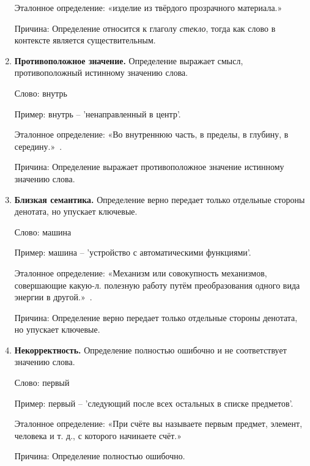 \documentclass[LI,VKR]{HSEUniversity}
\begin{document}
\begin{enumerate}
   Эталонное определение: «изделие из твёрдого прозрачного материала.»~\cite{TolkovyDmitriev}

   Причина: Определение относится к глаголу \textit{стекло}, тогда как слово в контексте является существительным.

\item \textbf{Противоположное значение.} Определение выражает смысл, противоположный истинному значению слова.

   Слово: внутрь

   Пример: внутрь – ’ненаправленный в центр’.

   Эталонное определение: «Во внутреннюю часть, в пределы, в глубину, в середину.»~\cite{TolkovyKuznetsov}.

   Причина: Определение выражает противоположное значение истинному значению слова.

\item \textbf{Близкая семантика.} Определение верно передает только отдельные стороны денотата, но упускает ключевые.

   Слово: машина

   Пример: машина – ’устройство с автоматическими функциями’.

   Эталонное определение: «Механизм или совокупность механизмов, совершающие какую-л. полезную работу путём преобразования одного вида энергии в другой.»~\cite{TolkovyKuznetsov}.

   Причина: Определение верно передает только отдельные стороны денотата, но упускает ключевые.

%
%
%

\item \textbf{Некорректность.} Определение полностью ошибочно и не соответствует значению слова.

   Слово: первый

   Пример: первый – ’следующий после всех остальных в списке предметов’.

   Эталонное определение: «При счёте вы называете первым предмет, элемент, человека и т. д., с которого начинаете счёт.»~\cite{TolkovyDmitriev}

   Причина: Определение полностью ошибочно.

%
%
%


\end{enumerate}
\end{document}
